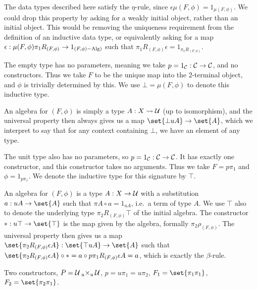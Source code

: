 \documentclass[../thesis.tex]{subfiles}
\begin{document}
\begin{remark}
  The data types described here satisfy the $\eta$-rule, since $\epsilon\mu(F,\phi) = 1_{\mu(F,\phi)}$. We could
  drop this property by asking for a weakly initial object, rather than an initial object. This would be removing
  the uniqueness requirement from the definition of an inductive data type, or equivalently asking for a map
  $\epsilon : \mu(F,\phi)\pi_1R_{(F,\phi)} \to 1_{(F,\phi)\Alg)}$ such that $\pi_1 R_{(F,\phi)}\epsilon =
  1_{\pi_1R_{(F,\phi)}}$.
\end{remark}

\begin{example}
  The empty type has no parameters, meaning we take $p = 1_\cC : \cC \to \cC$, and no constructors. Thus we
  take $F$ to be the unique map into the 2-terminal object, and $\phi$ is trivially determined by this.
  We use $\bot = \mu(F,\phi)$ to denote this inductive type. 

  An algebra for $(F,\phi)$ is simply a type $A : X \loose \cU$ (up to isomorphism), and the universal property
  then always gives us a map $\set{\bot uA} \to \set{A}$, which we interpret to say that for any context
  containing $\bot$, we have an element of any type.
\end{example}

\begin{example}
  The unit type also has no parameters, so $p = 1_\cC : \cC \to \cC$. It has exactly one constructor, and
  this constructor takes no arguments. Thus we take $F = p\pi_1$ and $\phi = 1_{p\pi_1}$. We denote the
  inductive type for this signature by $\top$.

  An algebra for $(F,\phi)$ is a type $A : X \to \cU$ with a substitution $a : uA \to \set{A}$ such that
  $\pi A \circ a = 1_{uA}$, i.e.\ a term of type $A$. We use $\top$ also to denote the underlying type
  $\pi_2 R_{(F,\phi)}\top$ of the initial algebra. The constructor $* : u\top \to \set{\top}$ is the map
  given by the algebra, formally $\pi_2 \rho_{(F,\phi)}$. The universal property then gives us a map
  $\set{\pi_2R_{(F,\phi)}\epsilon A} : \set{\top uA} \to \set{A}$ such that $\set{\pi_2 R_{(F,\phi)}\epsilon A}
  \circ * = a \circ p\pi_1R_{(F,\phi)}\epsilon A = a$, which is exactly the
  $\beta$-rule.
\end{example}

\begin{example}
  Two constructors, $P = \cU \pb[u]{u} \cU$, $p = u\pi_1 = u\pi_2$, $F_1 = \set{\pi_1\pi_1}$, $F_2 =
  \set{\pi_2\pi_1}$. 
\end{example}
\end{document}

